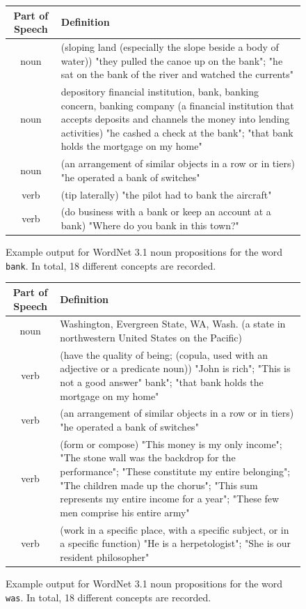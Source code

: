 \documentclass[a4paper,12pt,oneside,openright]{report}
\begin{document}
\begin{figure}
\begin{center}
\begin{tabular}{ | c | p{11cm} | } 
 \hline
 Part of Speech & Definition \\  
 \hline
noun     & (sloping land (especially the slope beside a body of water)) "they pulled the canoe up on the bank"; "he sat on the bank of the river and watched the currents"\\ 
noun     & depository financial institution, bank, banking concern, banking company (a financial institution that accepts deposits and channels the money into lending activities) "he cashed a check at the bank"; "that bank holds the mortgage on my home" \\ 
 noun     & (an arrangement of similar objects in a row or in tiers) "he operated a bank of switches"  \\ 
verb & (tip laterally) "the pilot had to bank the aircraft" \\ 
verb    & (do business with a bank or keep an account at a bank) "Where do you bank in this town?"  \\ 
 \hline
\end{tabular}
\end{center}
\caption{Example output for WordNet 3.1 noun propositions for the word \texttt{bank}. In total, 18 different concepts are recorded.}
\label{fig:bank_synset}
\end{figure}

\begin{figure}
\begin{center}
\begin{tabular}{ | c | p{11cm} | } 
 \hline
 Part of Speech & Definition \\ 
 \hline
noun     & Washington, Evergreen State, WA, Wash. (a state in northwestern United States on the Pacific) \\ 
verb     & (have the quality of being; (copula, used with an adjective or a predicate noun)) "John is rich"; "This is not a good answer"
 bank"; "that bank holds the mortgage on my home" \\ 
 verb     & (an arrangement of similar objects in a row or in tiers) "he operated a bank of switches"  \\ 
verb & (form or compose) "This money is my only income"; "The stone wall was the backdrop for the performance"; "These constitute my entire belonging"; "The children made up the chorus"; "This sum represents my entire income for a year"; "These few men comprise his entire army" \\ 
verb    & (work in a specific place, with a specific subject, or in a specific function) "He is a herpetologist"; "She is our resident philosopher"  \\ 
 \hline
\end{tabular}
\end{center}
\caption{Example output for WordNet 3.1 noun propositions for the word \texttt{was}. In total, 18 different concepts are recorded.}
\label{fig:was_synset}
\end{figure}
\end{document}
